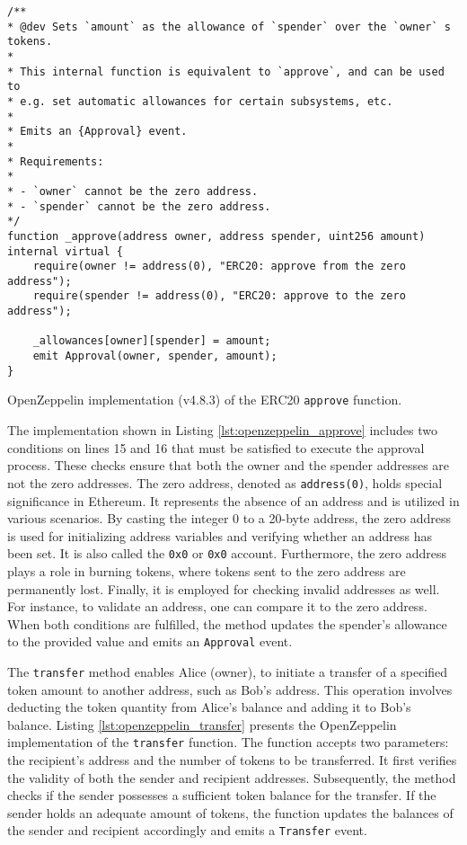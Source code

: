 \begin{listing}[!ht]
    \begin{verbatim}
/**
* @dev Sets `amount` as the allowance of `spender` over the `owner` s tokens.
*
* This internal function is equivalent to `approve`, and can be used to
* e.g. set automatic allowances for certain subsystems, etc.
*
* Emits an {Approval} event.
*
* Requirements:
*
* - `owner` cannot be the zero address.
* - `spender` cannot be the zero address.
*/
function _approve(address owner, address spender, uint256 amount) internal virtual {
    require(owner != address(0), "ERC20: approve from the zero address");
    require(spender != address(0), "ERC20: approve to the zero address");

    _allowances[owner][spender] = amount;
    emit Approval(owner, spender, amount);
}
    \end{verbatim}
    \caption{OpenZeppelin implementation (v4.8.3) of the ERC20 \texttt{approve} function.}
    \label{lst:openzeppelin_approve}
\end{listing}

The implementation shown in Listing \ref{lst:openzeppelin_approve} includes two conditions on lines 15 and 16 that must be satisfied to execute the approval process. These checks ensure that both the owner and the spender addresses are not the zero addresses.
The zero address, denoted as \texttt{address(0)}, holds special significance in Ethereum. It represents the absence of an address and is utilized in various scenarios. By casting the integer 0 to a 20-byte address, the zero address is used for initializing address variables and verifying whether an address has been set. It is also called the \texttt{0x0} or \texttt{0x0} account.
Furthermore, the zero address plays a role in burning tokens, where tokens sent to the zero address are permanently lost. Finally, it is employed for checking invalid addresses as well. For instance, to validate an address, one can compare it to the zero address. When both conditions are fulfilled, the method updates the spender's allowance to the provided value and emits an \texttt{Approval} event.

The \texttt{transfer} method enables Alice (owner), to initiate a transfer of a specified token amount to another address, such as Bob's address. This operation involves deducting the token quantity from Alice's balance and adding it to Bob's balance.
Listing \ref{lst:openzeppelin_transfer} presents the OpenZeppelin implementation of the \texttt{transfer} function. The function accepts two parameters: the recipient's address and the number of tokens to be transferred. It first verifies the validity of both the sender and recipient addresses. Subsequently, the method checks if the sender possesses a sufficient token balance for the transfer. If the sender holds an adequate amount of tokens, the function updates the balances of the sender and recipient accordingly and emits a \texttt{Transfer} event.

